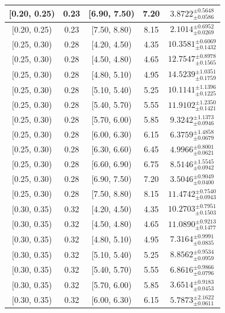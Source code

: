 \begin{longtable}{|c|c|c|c|c|}
\hline
[0.20, 0.25) & 0.23 & [6.90, 7.50) & 7.20 & $3.8722^{ \pm 0.5648 }_{ \pm 0.0586 }$ \\ 
\hline
[0.20, 0.25) & 0.23 & [7.50, 8.80) & 8.15 & $2.1014^{ \pm 0.6952 }_{ \pm 0.0269 }$ \\ 
\hline
[0.25, 0.30) & 0.28 & [4.20, 4.50) & 4.35 & $10.3581^{ \pm 0.6069 }_{ \pm 0.1432 }$ \\ 
\hline
[0.25, 0.30) & 0.28 & [4.50, 4.80) & 4.65 & $12.7547^{ \pm 0.8978 }_{ \pm 0.1565 }$ \\ 
\hline
[0.25, 0.30) & 0.28 & [4.80, 5.10) & 4.95 & $14.5239^{ \pm 1.0351 }_{ \pm 0.1759 }$ \\ 
\hline
[0.25, 0.30) & 0.28 & [5.10, 5.40) & 5.25 & $10.1141^{ \pm 1.1396 }_{ \pm 0.1225 }$ \\ 
\hline
[0.25, 0.30) & 0.28 & [5.40, 5.70) & 5.55 & $11.9102^{ \pm 1.2350 }_{ \pm 0.1421 }$ \\ 
\hline
[0.25, 0.30) & 0.28 & [5.70, 6.00) & 5.85 & $9.3242^{ \pm 1.1373 }_{ \pm 0.0946 }$ \\ 
\hline
[0.25, 0.30) & 0.28 & [6.00, 6.30) & 6.15 & $6.3759^{ \pm 1.4858 }_{ \pm 0.0679 }$ \\ 
\hline
[0.25, 0.30) & 0.28 & [6.30, 6.60) & 6.45 & $4.9966^{ \pm 0.8001 }_{ \pm 0.0621 }$ \\ 
\hline
[0.25, 0.30) & 0.28 & [6.60, 6.90) & 6.75 & $8.5146^{ \pm 1.5545 }_{ \pm 0.0942 }$ \\ 
\hline
[0.25, 0.30) & 0.28 & [6.90, 7.50) & 7.20 & $3.5046^{ \pm 0.9049 }_{ \pm 0.0400 }$ \\ 
\hline
[0.25, 0.30) & 0.28 & [7.50, 8.80) & 8.15 & $11.4742^{ \pm 0.7540 }_{ \pm 0.0943 }$ \\ 
\hline
[0.30, 0.35) & 0.32 & [4.20, 4.50) & 4.35 & $10.2703^{ \pm 0.7951 }_{ \pm 0.1503 }$ \\ 
\hline
[0.30, 0.35) & 0.32 & [4.50, 4.80) & 4.65 & $11.0890^{ \pm 0.9213 }_{ \pm 0.1477 }$ \\ 
\hline
[0.30, 0.35) & 0.32 & [4.80, 5.10) & 4.95 & $7.3164^{ \pm 0.9991 }_{ \pm 0.0835 }$ \\ 
\hline
[0.30, 0.35) & 0.32 & [5.10, 5.40) & 5.25 & $8.8562^{ \pm 0.9534 }_{ \pm 0.0959 }$ \\ 
\hline
[0.30, 0.35) & 0.32 & [5.40, 5.70) & 5.55 & $6.8616^{ \pm 0.9866 }_{ \pm 0.0796 }$ \\ 
\hline
[0.30, 0.35) & 0.32 & [5.70, 6.00) & 5.85 & $3.6514^{ \pm 0.9183 }_{ \pm 0.0453 }$ \\ 
\hline
[0.30, 0.35) & 0.32 & [6.00, 6.30) & 6.15 & $5.7873^{ \pm 2.1622 }_{ \pm 0.0611 }$ \\ 

\end{longtable}
